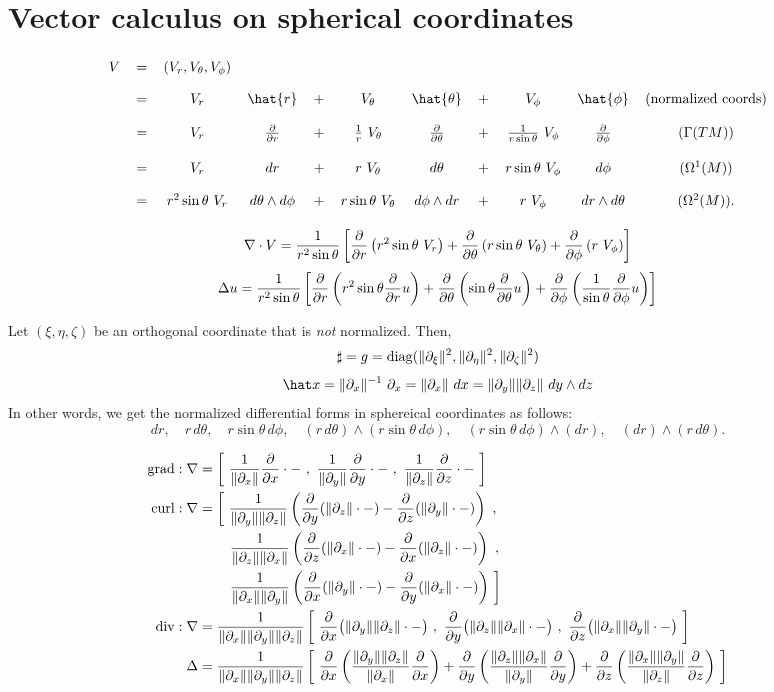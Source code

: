 \documentclass[a4paper]{article}
\begin{document}
\section{Vector calculus on spherical coordinates}
\[
\begin{tikzcd}[row sep=5pt, column sep=3pt]
V&=&(V_r,V_\theta,V_\phi)&&&&&&&&\\
&=&V_r&\hat{r}&+&V_\theta&\hat{\theta}&+&V_\phi&\hat{\phi}&(\text{normalized coords})\\
&=&V_r&\pd{r}&+&\frac1r\ V_\theta&\pd{\theta}&+&\frac1{r\sin\theta}\ V_\phi&\pd{\phi}&(\Gamma(TM))\\
&=&V_r&dr&+&r\ V_\theta&d\theta&+&r\sin\theta\ V_\phi&d\phi&(\Omega^1(M))\\
&=&r^2\sin\theta\ V_r&d\theta\wedge d\phi&+&r\sin\theta\ V_\theta&d\phi\wedge dr&+&r\ V_\phi&dr\wedge d\theta&(\Omega^2(M)).
\end{tikzcd}
\]

\[
\nabla\cdot V=\frac1{r^2\sin\theta}\left[  \pd{r}\left(r^2\sin\theta\ V_r\right) + \pd{\theta}\left(r\sin\theta\ V_\theta\right) + \pd{\phi}\left(r\ V_\phi\right)  \right]
\]
\[\Delta u=\frac1{r^2\sin\theta}\left[\pd{r}\left(r^2\sin\theta\pd{r}u\right)+\pd{\theta}\left(\sin\theta\pd{\theta}u\right)+\pd{\phi}\left(\frac1{\sin\theta}\pd{\phi}u\right)\right]\]

Let $(\xi,\eta,\zeta)$ be an orthogonal coordinate that is \emph{not} normalized.
Then,
\[\sharp=g=\diag(\|\pd_\xi\|^2,\|\pd_\eta\|^2,\|\pd_\zeta\|^2)\]
\[\hat x=\|\pd_x\|^{-1}\ \pd_x=\|\pd_x\|\ dx=\|\pd_y\|\|\pd_z\|\ dy\wedge dz\]
In other words, we get the normalized differential forms in sphereical coordinates as follows:
\[dr,\quad r\,d\theta,\quad r\sin\theta\,d\phi,\quad(r\,d\theta)\wedge(r\sin\theta\,d\phi),\quad(r\sin\theta\,d\phi)\wedge(dr),\quad(dr)\wedge(r\,d\theta).\]

\begin{align*}
\grad:\nabla&=\left[\ \frac1{\|\pd_x\|}\pd{x}\cdot-\ ,\ \frac1{\|\pd_y\|}\pd{y}\cdot-\ ,\ \frac1{\|\pd_z\|}\pd{z}\cdot-\ \right]\\
\curl:\nabla&=\left[\ \frac1{\|\pd_y\|\|\pd_z\|}\left(\pd{y}(\|\pd_z\|\cdot-)-\pd{z}(\|\pd_y\|\cdot-)\right)\ ,\right.\\
&\qquad\left.\frac1{\|\pd_z\|\|\pd_x\|}\left(\pd{z}(\|\pd_x\|\cdot-)-\pd{x}(\|\pd_z\|\cdot-)\right)\ ,\right.\\
&\qquad\left.\frac1{\|\pd_x\|\|\pd_y\|}\left(\pd{x}(\|\pd_y\|\cdot-)-\pd{y}(\|\pd_x\|\cdot-)\right)\ \right]\\
\div:\nabla&=\frac1{\|\pd_x\|\|\pd_y\|\|\pd_z\|}\left[\ \pd{x}\bigl(\|\pd_y\|\|\pd_z\|\cdot-\bigr)\ ,\ \pd{y}\bigl(\|\pd_z\|\|\pd_x\|\cdot-\bigr)\ ,\ \pd{z}\bigl(\|\pd_x\|\|\pd_y\|\cdot-\bigr)\ \right]\\
\Delta&=\frac1{\|\pd_x\|\|\pd_y\|\|\pd_z\|}\left[\ \pd{x}\left(\frac{\|\pd_y\|\|\pd_z\|}{\|\pd_x\|}\pd{x}\right)+\pd{y}\left(\frac{\|\pd_z\|\|\pd_x\|}{\|\pd_y\|}\pd{y}\right)+\pd{z}\left(\frac{\|\pd_x\|\|\pd_y\|}{\|\pd_z\|}\pd{z}\right)\ \right]
\end{align*}
\end{document}
